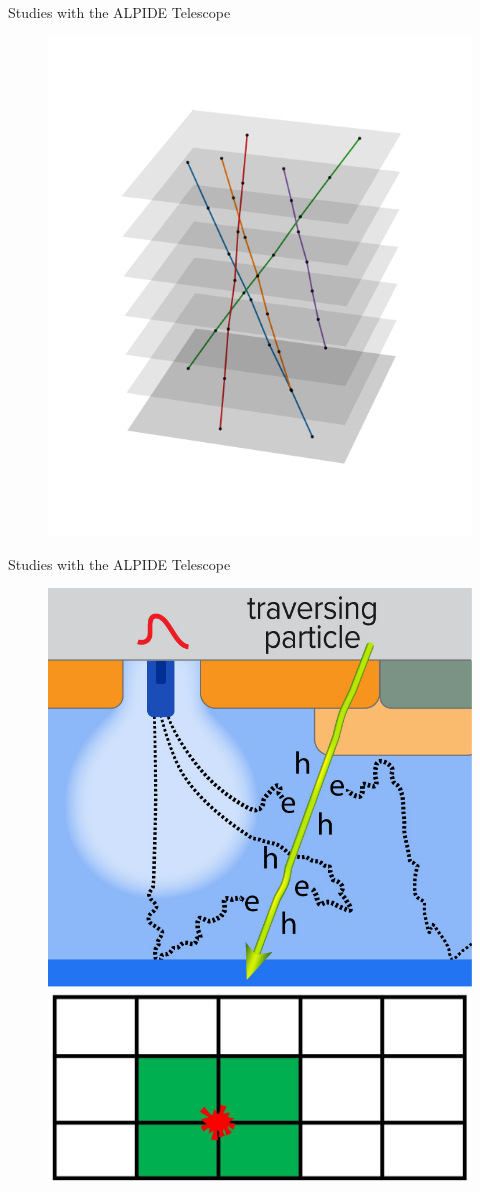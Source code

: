 \documentclass{beamer}
\begin{document}
\begin{frame}{Studies with the ALPIDE Telescope}
\begin{minipage}{.44\textwidth}
\begin{itemize}
	\end{itemize}
    \end{minipage}
    \begin{minipage}{.55\textwidth}
	\begin{figure}[H]
	    \centering
	    \includegraphics[width=\textwidth]{outlook.png}
	\end{figure}
    \end{minipage}
\end{frame}

\begin{frame}{Studies with the ALPIDE Telescope}
    \begin{figure}[H]
	\centering
	\includegraphics[width=.49\textwidth]{EH.jpg}
	\includegraphics[width=.5\textwidth]{Davi.jpg}
\end{figure}
\end{frame}
\end{document}

